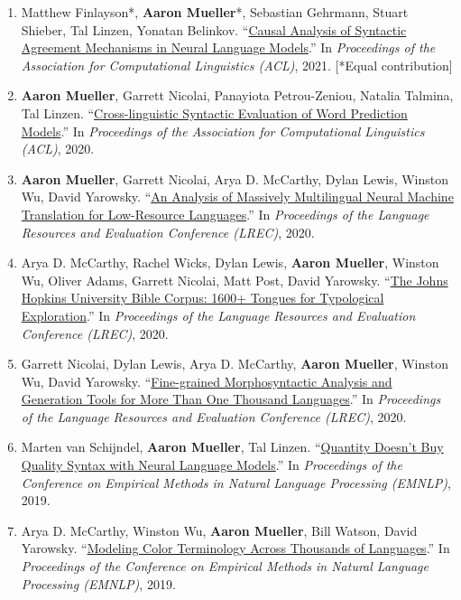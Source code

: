 \documentclass[10pt]{article}
\providecommand*\titlelink[2]{\href{#1}{\textcolor{accent}{#2}}}
\begin{document}
\begin{enumerate}[leftmargin=*, topsep=0pt, itemsep=0.25ex, partopsep=0ex, parsep=1ex, label=C\arabic*., ref=C\arabic*]
	\item Matthew Finlayson*, \textbf{Aaron Mueller}*, Sebastian Gehrmann, Stuart Shieber, Tal Linzen, Yonatan Belinkov. ``\titlelink{https://aclanthology.org/2021.acl-long.144/}{Causal Analysis of Syntactic Agreement Mechanisms in Neural Language Models}.'' In \emph{Proceedings of the Association for Computational Linguistics (ACL)}, 2021. [*Equal contribution]\label{pub:causal}
	
	\item \textbf{Aaron Mueller}, Garrett Nicolai, Panayiota Petrou-Zeniou, Natalia Talmina, Tal Linzen. ``\titlelink{https://aclanthology.org/2020.acl-main.490/}{Cross-linguistic Syntactic Evaluation of Word Prediction Models}.'' In \emph{Proceedings of the Association for Computational Linguistics (ACL)}, 2020.

	\item \textbf{Aaron Mueller}, Garrett Nicolai, Arya D. McCarthy, Dylan Lewis, Winston Wu, David Yarowsky. ``\titlelink{https://aclanthology.org/2020.lrec-1.458/}{An Analysis of Massively Multilingual Neural Machine Translation for Low-Resource Languages}.'' In \emph{Proceedings of the Language Resources and Evaluation Conference (LREC)}, 2020.

	\item Arya D. McCarthy, Rachel Wicks, Dylan Lewis, \textbf{Aaron Mueller}, Winston Wu, Oliver Adams, Garrett Nicolai, Matt Post, David Yarowsky. ``\titlelink{https://aclanthology.org/2020.lrec-1.352/}{The Johns Hopkins University Bible Corpus: 1600+ Tongues for Typological Exploration}.'' In \emph{Proceedings of the Language Resources and Evaluation Conference (LREC)}, 2020.

	\item Garrett Nicolai, Dylan Lewis, Arya D. McCarthy, \textbf{Aaron Mueller}, Winston Wu, David Yarowsky. ``\titlelink{https://aclanthology.org/2020.lrec-1.488/}{Fine-grained Morphosyntactic Analysis and Generation Tools for More Than One Thousand Languages}.'' In \emph{Proceedings of the Language Resources and Evaluation Conference (LREC)}, 2020.

	\item Marten van Schijndel, \textbf{Aaron Mueller}, Tal Linzen. ``\titlelink{https://aclanthology.org/D19-1592/}{Quantity Doesn't Buy Quality Syntax with Neural Language Models}.'' In \emph{Proceedings of the Conference on Empirical Methods in Natural Language Processing (EMNLP)}, 2019.

	\item Arya D. McCarthy, Winston Wu, \textbf{Aaron Mueller}, Bill Watson, David Yarowsky. ``\titlelink{https://aclanthology.org/D19-1229/}{Modeling Color Terminology Across Thousands of Languages}.'' In \emph{Proceedings of the Conference on Empirical Methods in Natural Language Processing (EMNLP)}, 2019.

	\end{enumerate}
\end{document}
